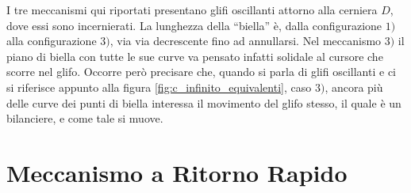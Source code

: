 \noindent I tre meccanismi qui riportati presentano glifi
oscillanti attorno alla cerniera $D$, dove essi sono incernierati.
La lunghezza della ``biella'' \`e, dalla configurazione $1)$ alla
configurazione $3)$,  via via decrescente fino ad annullarsi.
Nel meccanismo $3)$ il piano di biella con tutte le sue curve
va pensato infatti solidale al cursore che scorre nel glifo.
Occorre per\`o precisare che, quando si parla di glifi oscillanti e ci si riferisce
appunto alla figura \ref{fig:c_infinito_equivalenti}, caso $3)$, ancora
pi\`u delle curve
dei punti di biella interessa il movimento del glifo stesso,
il quale \`e un bilanciere, e come tale si muove.

\section{Meccanismo a Ritorno Rapido}

